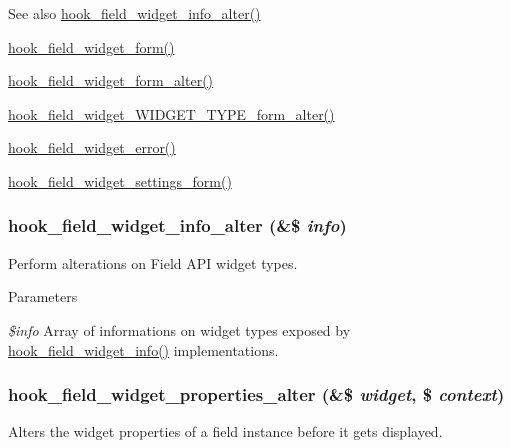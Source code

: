 \begin{DoxySeeAlso}{See also}
\hyperlink{group__field__widget_ga2e74ac1b4b45e9f31b58b86d01892e7e}{hook\_\-field\_\-widget\_\-info\_\-alter()} 

\hyperlink{group__field__widget_gaa9b0e55fd0eb57ac0f9c7c30d251971b}{hook\_\-field\_\-widget\_\-form()} 

\hyperlink{group__field__widget_gaca9d517ab0584fa2428779d8aa24a441}{hook\_\-field\_\-widget\_\-form\_\-alter()} 

\hyperlink{group__field__widget_ga6f53f1874a16e18c27dcc0cc4e7c1ec6}{hook\_\-field\_\-widget\_\-WIDGET\_\-TYPE\_\-form\_\-alter()} 

\hyperlink{group__field__widget_ga9a2031578542fef9e296d79c946431fd}{hook\_\-field\_\-widget\_\-error()} 

\hyperlink{group__field__types_gabe5ece2134d0cbdfc3c4793f24c5866c}{hook\_\-field\_\-widget\_\-settings\_\-form()} 
\end{DoxySeeAlso}
\hypertarget{group__field__widget_ga2e74ac1b4b45e9f31b58b86d01892e7e}{
\subsubsection[{hook\_\-field\_\-widget\_\-info\_\-alter}]{\setlength{\rightskip}{0pt plus 5cm}hook\_\-field\_\-widget\_\-info\_\-alter (\&\$ {\em info})}}
\label{group__field__widget_ga2e74ac1b4b45e9f31b58b86d01892e7e}
Perform alterations on Field API widget types.


\begin{DoxyParams}{Parameters}
\item[{\em \$info}]Array of informations on widget types exposed by \hyperlink{group__field__widget_gac53aa6c2a4ac1215660d25b5d7f20792}{hook\_\-field\_\-widget\_\-info()} implementations. \end{DoxyParams}
\hypertarget{group__field__widget_gaa88988bce1ffbec1f481ec7a3ba87e51}{
\subsubsection[{hook\_\-field\_\-widget\_\-properties\_\-alter}]{\setlength{\rightskip}{0pt plus 5cm}hook\_\-field\_\-widget\_\-properties\_\-alter (\&\$ {\em widget}, \/  \$ {\em context})}}
\label{group__field__widget_gaa88988bce1ffbec1f481ec7a3ba87e51}
Alters the widget properties of a field instance before it gets displayed.

